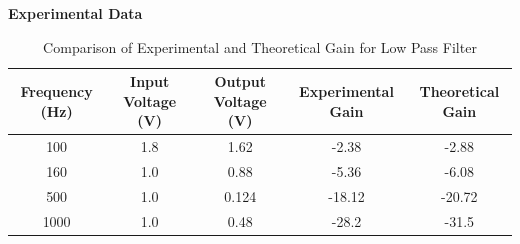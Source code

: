\documentclass{article}
\begin{document}
\textbf{Experimental Data}
\begin{table}[H]
    \centering
    \begin{tabular}{|c|c|c|c|c|}
        \hline
        Frequency (Hz) & Input Voltage (V) & Output Voltage (V) & Experimental Gain & Theoretical Gain\\
        \hline
        100 & 1.8 & 1.62 & -2.38 & -2.88 \\
        160 & 1.0 & 0.88 & -5.36 & -6.08 \\
        500 & 1.0 & 0.124 & -18.12 & -20.72 \\
        1000 & 1.0 & 0.48 & -28.2 & -31.5 \\
        \hline
    \end{tabular}
    \caption{Comparison of Experimental and Theoretical Gain for Low Pass Filter}
    \label{tab:exp_data_lpf}
\end{table}
\begin{figure}[H]
    \centering
    \hfill
\end{figure}
\end{document}
